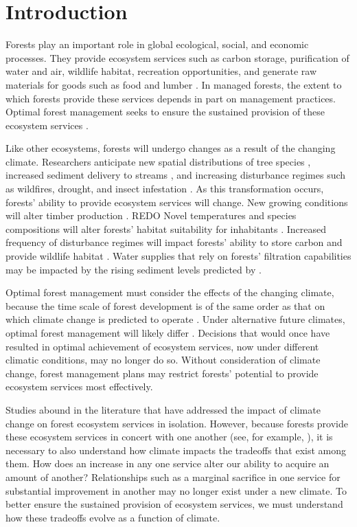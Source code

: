 
\section{Introduction}
 
Forests play an important role in global ecological, social, and economic processes. They provide ecosystem services such as carbon storage, purification of water and air, wildlife habitat, recreation opportunities, and generate raw materials for goods such as food and lumber \cite{daily1997ecosystem}. In managed forests, the extent to which forests provide these services depends in part on management practices. Optimal forest management seeks to ensure the sustained provision of these ecosystem services \cite{cfrForestMgmt}.

Like other ecosystems, forests will undergo changes as a result of the changing climate. Researchers anticipate new spatial distributions of tree species \cite{iverson1998predicting}, increased sediment delivery to streams \cite{Goode20121}, and increasing disturbance regimes such as wildfires, drought, and insect infestation \cite{vose2012effects}. As this transformation occurs, forests' ability to provide ecosystem services will change. New growing conditions will alter timber production \cite{forschungsanstalten2009adaptation}. REDO Novel temperatures and species compositions will alter forests' habitat suitability for inhabitants \cite{harding1997ecosystem}. Increased frequency of disturbance regimes will impact forests' ability to store carbon \cite{bonan2008forests} and provide wildlife habitat \cite{mckenzie2004climatic}. Water supplies that rely on forests' filtration capabilities may be impacted by the rising sediment levels predicted by \cite{Goode20121}.

Optimal forest management must consider the effects of the changing climate, because the time scale of forest development is of the same order as that on which climate change is predicted to operate \cite{ipcc2013climate}. Under alternative future climates, optimal forest management will likely differ \cite{linder2000developing}. Decisions that would once have resulted in optimal achievement of ecosystem services, now under different climatic conditions, may no longer do so. Without consideration of climate change, forest management plans may restrict forests' potential to provide ecosystem services most effectively.

Studies abound in the literature that have addressed the impact of climate change on forest ecosystem services in isolation. However, because forests provide these ecosystem services in concert with one another (see, for example, \cite{toth2009finding}), it is necessary to also understand how climate impacts the tradeoffs that exist among them. How does an increase in any one service alter our ability to acquire an amount of another? Relationships such as a marginal sacrifice in one service for substantial improvement in another may no longer exist under a new climate. To better ensure the sustained provision of ecosystem services, we must understand how these tradeoffs evolve as a function of climate.

